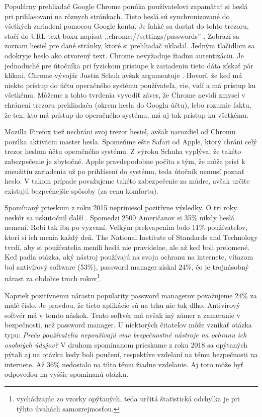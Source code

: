 \par Populárny prehliadač Google Chrome ponúka používateľovi zapamätať si heslá pri prihlasovaní na rôznych stránkach. Tieto heslá sú synchronizované do všetkých zariadení pomocou Google konta. Je ľahké sa dostať do tohto trezoru, stačí do URL text-boxu napísať ,,chrome://settings/passwords'' \cite{21}. Zobrazí sa zoznam hesiel pre dané stránky, ktoré si prehliadač ukladal. Jedným tlačidlom sa odokryje heslo ako otvorený text. Chrome nevyžaduje žiadnu autentizáciu. Je jednoduché pre útočníka pri fyzickom prístupe k zariadeniu tieto dáta získať pár klikmi. Chrome vývojár Justin Schuh avšak argumentuje \cite{21}. Hovorí, že keď má niekto prístup do účtu operačného systému používateľa, vie, vidí a má prístup ku všetkému. Môžeme z tohto tvrdenia vyvodiť záver, že Chrome nevidí zmysel v chránení trezoru prehliadača (okrem hesla do Googlu účtu), lebo rozumie faktu, že ten, kto má prístup do operačného systému, má aj tak prístup ku všetkému.
\par Mozilla Firefox tiež nechráni svoj trezor hesiel, avšak narozdiel od Chromu ponúka aktiváciu master hesla. Spomeňme ešte Safari od Apple, ktorý chráni celý trezor heslom účtu operačného systému. Z výroku Schuha vyplýva, že takéto zabezpečenie je zbytočné. Apple pravdepodobne počíta s tým, že môže prísť k zneužitiu zariadenia už po prihlásení do systému, teda útočník nemusí poznať heslo. V takom prípade považujeme takéto zabezpečenie za múdre, avšak určite existujú bezpečnejšie spôsoby (za cenu komfortu).
\par Spomínaný prieskum z roku 2015 nepriniesol pozitívne výsledky. O tri roky neskôr sa uskutočnil ďalší \cite{22}. Spomedzi 2500 Američanov si 35\% nikdy heslá nemení. Robí tak iba po vyzvaní. Veľkým prekvapením bolo 11\% používateľov, ktorí si ich menia každý deň. The National Institute of Standards and Technology tvrdí, aby si používatelia menili heslá nie pravidelne, ale až keď boli prelomené. Keď padla otázka, aký nástroj používajú na svoju ochranu na internete, víťazom bol antivírový software (53\%), password manager získal 24\%, čo je trojnásobný nárast za obdobie troch rokov\footnote{vychádzajúc zo vzorky opýtaných, teda určitá štatistická odchylka je pri týhto úvahách samozrejmosťou.}.
\par Napriek pozitívnemu nárastu popularity password managerov považujeme 24\% za malé číslo. Je pravdou, že tieto aplikácie sú na trhu nie tak dlho. Antivírový softvér má v tomto náskok. Tento softvér má avšak iný zámer a zameranie v bezpečnosti, než password manager. U niektorých čitateľov môže vznikať otázka typu: \textit{Prečo používatelia nepoužívajú viac bezpečnostné nástroje na ochranu ich osobných údajov?} V druhom spomínanom prieskume z roku 2018 sa opýtaných pýtali aj na otázku kedy boli poučení, respektíve vzdelaní na tému bezpečnosti na internete. Až 36\% nedostalo na túto tému žiadne vzdelanie. Aj toto môže byť odpoveďou na vyššie spomínanú otázku.
